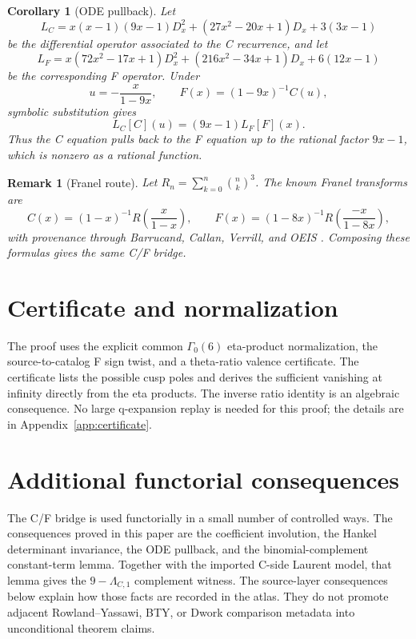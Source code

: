\documentclass[11pt,a4paper]{article}
\newtheorem{corollary}[theorem]{Corollary}
\newtheorem{remark}[theorem]{Remark}
\begin{document}
\begin{corollary}[ODE pullback]
\label{cor:ode}
Let
\[
  L_C=x(x-1)(9x-1)D_x^2+(27x^2-20x+1)D_x+3(3x-1)
\]
be the differential operator associated to the C recurrence, and let
\[
  L_F=x(72x^2-17x+1)D_x^2+(216x^2-34x+1)D_x+6(12x-1)
\]
be the corresponding F operator.  Under
\[
  u=-\frac{x}{1-9x},\qquad F(x)=(1-9x)^{-1}C(u),
\]
symbolic substitution gives
\[
  L_C[C](u)=(9x-1)L_F[F](x).
\]
Thus the C equation pulls back to the F equation up to the rational factor
$9x-1$, which is nonzero as a rational function.
\end{corollary}

\begin{remark}[Franel route]
\label{rem:franel}
Let $R_n=\sum_{k=0}^n\binom{n}{k}^3$.  The known Franel transforms are
\[
  C(x)=(1-x)^{-1}R\!\left(\frac{x}{1-x}\right),\qquad
  F(x)=(1-8x)^{-1}R\!\left(\frac{-x}{1-8x}\right),
\]
with provenance through Barrucand, Callan, Verrill, and OEIS
\cite{barrucand_1975_franel_c,callan_2008_franel_c,verrill_2010_congruences_modular_forms}.
Composing these formulas gives the same C/F bridge.
\end{remark}

\section{Certificate and normalization}
\label{sec:normalization}

The proof uses the explicit common $\Gamma_0(6)$ eta-product normalization,
the source-to-catalog F sign twist, and a theta-ratio valence certificate.
The certificate lists the possible cusp poles and derives the sufficient
vanishing at infinity directly from the eta products.  The inverse ratio
identity is an algebraic consequence.  No large q-expansion replay is needed
for this proof; the details are in Appendix~\ref{app:certificate}.

\section{Additional functorial consequences}
\label{sec:contracts}

The C/F bridge is used functorially in a small number of controlled ways.
The consequences proved in this paper are the coefficient involution, the Hankel
determinant invariance, the ODE pullback, and the binomial-complement
constant-term lemma.  Together with the imported C-side Laurent model, that
lemma gives the $9-\Lambda_{C,1}$ complement witness.  The source-layer
consequences below explain how those facts are recorded in the atlas.  They
do not promote adjacent Rowland--Yassawi, BTY, or Dwork comparison metadata
into unconditional theorem claims.
\end{document}
